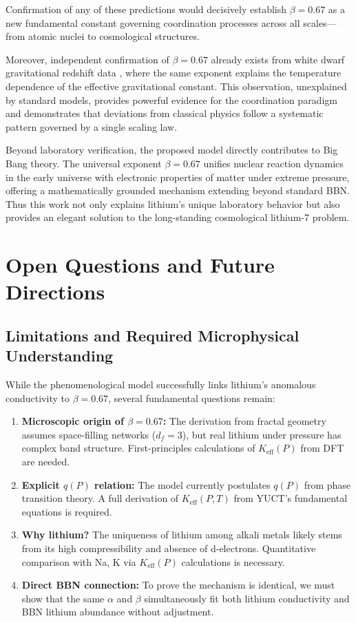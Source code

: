 \documentclass[12pt,a4paper]{article}
\theoremstyle{remark}
\newcommand{\Ke}{K_{\mathrm{eff}}}
\newcommand{\df}{d_{\!f}}
\newcommand{\alp}{\alpha}
\begin{document}
	Confirmation of any of these predictions would decisively establish \(\beta = 0.67\) as a new fundamental constant governing coordination processes across all scales—from atomic nuclei to cosmological structures.
	
	Moreover, independent confirmation of \(\beta = 0.67\) already exists from white dwarf gravitational redshift data \cite{Crumpler2024}, where the same exponent explains the temperature dependence of the effective gravitational constant. This observation, unexplained by standard models, provides powerful evidence for the coordination paradigm and demonstrates that deviations from classical physics follow a systematic pattern governed by a single scaling law.
	
	Beyond laboratory verification, the proposed model directly contributes to Big Bang theory. The universal exponent \(\beta = 0.67\) unifies nuclear reaction dynamics in the early universe with electronic properties of matter under extreme pressure, offering a mathematically grounded mechanism extending beyond standard BBN. Thus this work not only explains lithium's unique laboratory behavior but also provides an elegant solution to the long-standing cosmological lithium-7 problem.
	
	\section{Open Questions and Future Directions}
	\label{sec:open-questions}
	
	\subsection{Limitations and Required Microphysical Understanding}
	
	While the phenomenological model successfully links lithium's anomalous conductivity to \(\beta = 0.67\), several fundamental questions remain:
	
	\begin{enumerate}
		\item \textbf{Microscopic origin of \(\beta = 0.67\):} The derivation from fractal geometry assumes space-filling networks (\(\df = 3\)), but real lithium under pressure has complex band structure. First-principles calculations of \(\Ke(P)\) from DFT are needed.
		
		\item \textbf{Explicit \(q(P)\) relation:} The model currently postulates \(q(P)\) from phase transition theory. A full derivation of \(\Ke(P,T)\) from YUCT's fundamental equations is required.
		
		\item \textbf{Why lithium?} The uniqueness of lithium among alkali metals likely stems from its high compressibility and absence of d-electrons. Quantitative comparison with Na, K via \(\Ke(P)\) calculations is necessary.
		
		\item \textbf{Direct BBN connection:} To prove the mechanism is identical, we must show that the same \(\alp\) and \(\beta\) simultaneously fit both lithium conductivity and BBN lithium abundance without adjustment.
	\end{enumerate}
	
\end{document}
